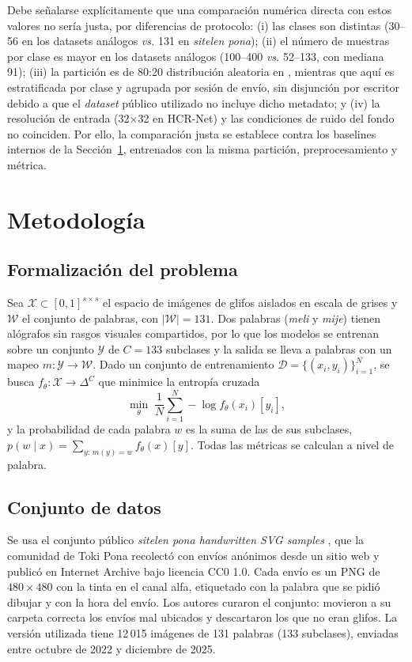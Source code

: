 \documentclass[conference]{IEEEtran}
\begin{document}
Debe señalarse explícitamente que una comparación numérica directa con estos
valores no sería justa, por diferencias de protocolo: (i) las clases son
distintas (30--56 en los datasets análogos \emph{vs.} 131 en
\textit{sitelen pona}); (ii) el número de muestras por clase es mayor en los
datasets análogos (100--400 \emph{vs.} 52--133, con mediana 91); (iii) la partición es
de 80:20 distribución aleatoria en \cite{hcrnet_2024}, mientras que aquí es
estratificada por clase y agrupada por sesión de envío, sin disjunción por escritor debido a que el
\textit{dataset} público utilizado no incluye dicho metadato; y (iv) la
resolución de entrada (32$\times$32 en HCR-Net) y las condiciones de ruido
del fondo no coinciden. Por ello, la comparación justa se establece contra
los baselines internos de la Sección~\ref{sec:methodology}, entrenados con la
misma partición, preprocesamiento y métrica.

\section{Metodología}
\label{sec:methodology}

\subsection{Formalización del problema}
Sea $\mathcal{X} \subset [0,1]^{s\times s}$ el espacio de imágenes de glifos
aislados en escala de grises y $\mathcal{W}$ el conjunto de palabras, con
$|\mathcal{W}| = 131$. Dos palabras (\textit{meli} y \textit{mije}) tienen
alógrafos sin rasgos visuales compartidos, por lo que los modelos se entrenan
sobre un conjunto $\mathcal{Y}$ de $C = 133$ subclases y la salida se lleva a
palabras con un mapeo $m: \mathcal{Y} \to \mathcal{W}$. Dado un conjunto de
entrenamiento $\mathcal{D} = \{(x_i, y_i)\}_{i=1}^{N}$, se busca
$f_{\theta}: \mathcal{X} \to \Delta^{C}$ que minimice la entropía cruzada
\begin{equation}
  \min_{\theta} \; \frac{1}{N}\sum_{i=1}^{N} - \log f_{\theta}(x_i)[y_i] ,
  \label{eq:loss}
\end{equation}
y la probabilidad de cada palabra $w$ es la suma de las de sus subclases,
$p(w \mid x) = \sum_{y:\, m(y)=w} f_{\theta}(x)[y]$. Todas las métricas se
calculan a nivel de palabra.

\subsection{Conjunto de datos}
Se usa el conjunto público \textit{sitelen pona handwritten SVG samples}
\cite{sitelen_pona_dataset}, que la comunidad de Toki Pona recolectó con
envíos anónimos desde un sitio web y publicó en Internet Archive bajo licencia
CC0 1.0. Cada envío es un PNG de $480\times480$ con la tinta en el canal alfa,
etiquetado con la palabra que se pidió dibujar y con la hora del envío. Los
autores curaron el conjunto: movieron a su carpeta correcta los envíos mal
ubicados y descartaron los que no eran glifos. La versión utilizada tiene
12\,015 imágenes de 131 palabras (133 subclases), enviadas entre octubre de
2022 y diciembre de 2025.
\end{document}

